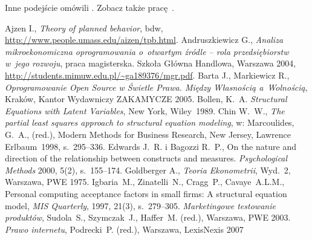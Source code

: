 \documentclass{report}
\begin{document}
Inne podejście omówili \cite{Chin1998,Igbaria1997,Ajzen-tpb}. 
Zobacz także pracę~\cite{EdwardsBagozzi2000}.

\begin{thebibliography}{99}
 Ajzen I., \emph{Theory of planned behavior\/},
 bdw, \url{http://www.people.umass.edu/aizen/tpb.html}.
  Andruszkiewicz G., \emph{Analiza
 mikroekonomiczna oprogramowania o~otwartym źródle -- rola
 przedsiębiorstw w~jego rozwoju}, praca magisterska. Szkoła Główna
 Handlowa, Warszawa 2004,
 \url{http://students.mimuw.edu.pl/~ga189376/mgr.pdf}.
  Barta J., Markiewicz R.,
 \emph{Oprogramowanie Open Source w Świetle Prawa. Między 
 Własnością a~Wolnością}, Kraków, Kantor Wydawniczy ZAKAMYCZE 2005.
 Bollen, K.~A. \emph{Structural Equations with 
 Latent Variables}, New York, Wiley~1989.
  Chin W.~W., \emph{The partial least squares 
 approach to structural equation modeling\/}, 
 w: Marcoulides, G.~A., (red.), Modern Methods for Business Research, 
 New Jersey, Lawrence Erlbaum~1998, s.~295--336. 
 Edwards J.~R. i Bagozzi R.~P.,
 On the nature and direction of the relationship between constructs 
 and measures. \emph{Psychological Methods\/} 2000, 5(2), s.~155--174.
 Goldberger A., \emph{Teoria Ekonometrii\/}, 
 Wyd.~2, Warszawa, PWE 1975.
 Igbaria~M., Zinatelli~N., Cragg~P., Cavaye~A.L.M.,
 Personal computing acceptance factors in small firms: A structural
 equation model, \emph{MIS Quarterly}, 1997, 21(3), s.~279--305.
\emph{Marketingowe testowanie produktów}, Sudola~S., Szymczak~J., 
 Haffer~M. (red.), Warszawa, PWE 2003.
  \emph{Prawo internetu\/}, Podrecki~P. (red.), 
 Warszawa, LexisNexis 2007
\end{thebibliography}
\end{document}
